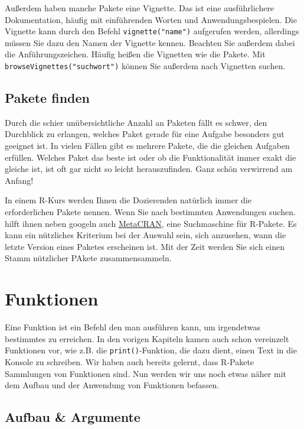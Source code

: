 \documentclass[
]{book}
\begin{document}
Außerdem haben manche Pakete eine Vignette. Das ist eine ausführlichere Dokumentation, häufig mit einführenden Worten und Anwendungsbespielen. Die Vignette kann durch den Befehl \texttt{vignette("name")} aufgerufen werden, allerdings müssen Sie dazu den Namen der Vignette kennen. Beachten Sie außerdem dabei die Anführungszeichen. Häufig heißen die Vignetten wie die Pakete. Mit \texttt{browseVignettes("suchwort")} können Sie außerdem nach Vignetten suchen.

\hypertarget{pakete-finden}{%
\subsection{Pakete finden}\label{pakete-finden}}

Durch die schier unübersichtliche Anzahl an Paketen fällt es schwer, den Durchblick zu erlangen, welches Paket gerade für eine Aufgabe besonders gut geeignet ist. In vielen Fällen gibt es mehrere Pakete, die die gleichen Aufgaben erfüllen. Welches Paket das beste ist oder ob die Funktionalität immer exakt die gleiche ist, ist oft gar nicht so leicht herauszufinden. Ganz schön verwirrend am Anfang!

In einem R-Kurs werden Ihnen die Dozierenden natürlich immer die erforderlichen Pakete nennen. Wenn Sie nach bestimmten Anwendungen suchen. hilft ihnen neben googeln auch \href{https://www.r-pkg.org/}{MetaCRAN}, eine Suchmaschine für R-Pakete. Es kann ein nützliches Kriterium bei der Auswahl sein, sich anzusehen, wann die letzte Version eines Paketes erscheinen ist. Mit der Zeit werden Sie sich einen Stamm nützlicher PAkete zusammensammeln.

\hypertarget{funktionen}{%
\section{Funktionen}\label{funktionen}}

Eine Funktion ist ein Befehl den man ausführen kann, um irgendetwas bestimmtes zu erreichen. In den vorigen Kapiteln kamen auch schon vereinzelt Funktionen vor, wie z.B. die \texttt{print()}-Funktion, die dazu dient, einen Text in die Konsole zu schreiben. Wir haben auch bereits gelernt, dass R-Pakete Sammlungen von Funktionen sind. Nun werden wir uns noch etwas näher mit dem Aufbau und der Anwendung von Funktionen befassen.

\hypertarget{aufbau-argumente}{%
\subsection{Aufbau \& Argumente}\label{aufbau-argumente}}
\end{document}
